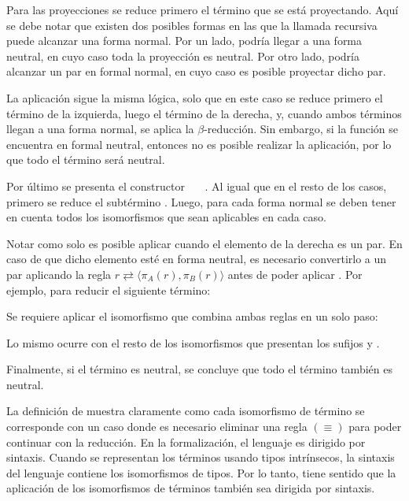 Para las proyecciones se reduce primero el término que se está proyectando.
Aquí se debe notar que existen dos posibles formas en las que la llamada recursiva puede alcanzar una forma normal.
Por un lado, podría llegar a una forma neutral, en cuyo caso toda la proyección es neutral.
Por otro lado, podría alcanzar un par en formal normal, en cuyo caso es posible proyectar dicho par.


La aplicación sigue la misma lógica, solo que en este caso se reduce primero el término de la izquierda, luego el término de la derecha, y, cuando ambos términos llegan a una forma normal, se aplica la $\beta$-reducción.
Sin embargo, si la función se encuentra en formal neutral, entonces no es posible realizar la aplicación, por lo que todo el término será neutral.


Por último se presenta el constructor \const{[}~~\const{]≡}~.
Al igual que en el resto de los casos, primero se reduce el subtérmino .
Luego, para cada forma normal se deben tener en cuenta todos los isomorfismos que sean aplicables en cada caso.


Notar como solo es posible aplicar  cuando el elemento de la derecha es un par.
En caso de que dicho elemento esté en forma neutral, es necesario convertirlo a un par aplicando la regla $r \rightleftarrows \langle \pi_A (r), \pi_B(r) \rangle$ antes de poder aplicar .
Por ejemplo, para reducir el siguiente término:


Se requiere aplicar el isomorfismo  que combina ambas reglas en un solo paso:


Lo mismo ocurre con el resto de los isomorfismos que presentan los sufijos  y \const{$\eta$}.

Finalmente, si el término  es neutral, se concluye que todo el término también es neutral.

La definición de  muestra claramente como cada isomorfismo de término se corresponde con un caso donde es necesario eliminar una regla $(\equiv)$ para poder continuar con la reducción.
En la formalización, el lenguaje es dirigido por sintaxis.
Cuando se representan los términos usando tipos intrínsecos, la sintaxis del lenguaje contiene los isomorfismos de tipos.
Por lo tanto, tiene sentido que la aplicación de los isomorfismos de términos también sea dirigida por sintaxis.

